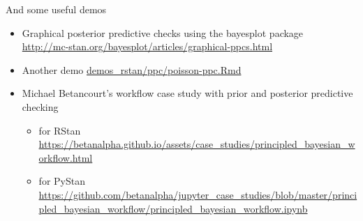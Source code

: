 \documentclass[a4paper,11pt,english]{article}
\begin{document}
And some useful demos
\begin{itemize}
  \item Graphical posterior predictive checks using the bayesplot package\\
    \url{http://mc-stan.org/bayesplot/articles/graphical-ppcs.html}
  \item Another demo \href{http://avehtari.github.io/BDA_R_demos/demos_rstan/ppc/poisson-ppc.html}{demos\_rstan/ppc/poisson-ppc.Rmd}
  \item Michael Betancourt's workflow case study with prior and posterior predictive checking
    \begin{itemize}
    \item for RStan \url{https://betanalpha.github.io/assets/case_studies/principled_bayesian_workflow.html}
    \item for PyStan \url{https://github.com/betanalpha/jupyter_case_studies/blob/master/principled_bayesian_workflow/principled_bayesian_workflow.ipynb}
    \end{itemize}
  \end{itemize}
\end{document}

